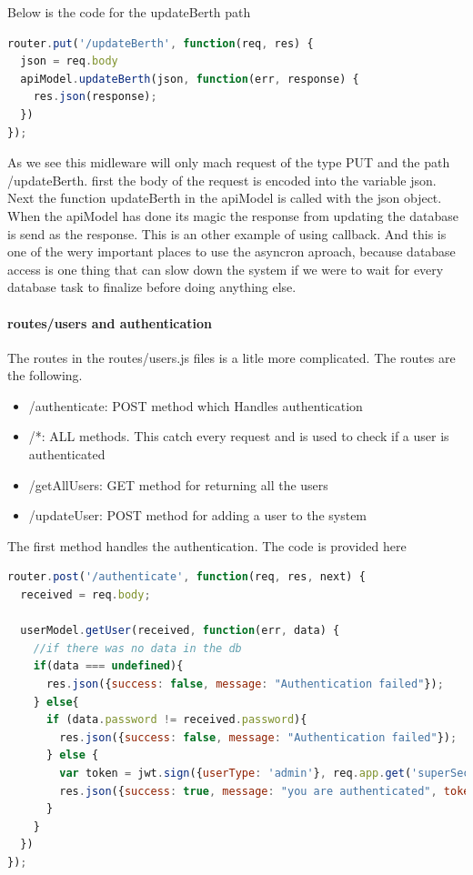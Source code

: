 \documentclass[a4paper,12pt,english]{article}
\begin{document}
Below is the code for the updateBerth path

\begin{lstlisting}[language=javascript] 
router.put('/updateBerth', function(req, res) {
  json = req.body
  apiModel.updateBerth(json, function(err, response) {
    res.json(response);
  })
});
\end{lstlisting}
As we see this midleware will only mach request of the type PUT and the path /updateBerth. first the body of the request is encoded into the variable json. Next the function updateBerth in the apiModel is called with the json object. When the apiModel has done its magic the response from updating the database is send as the response. This is an other example of using callback. And this is one of the wery important places to use the asyncron aproach, because database access is one thing that can slow down the system if we were to wait for every database task to finalize before doing anything else.

\paragraph{routes/users and authentication}
The routes in the routes/users.js files is a litle more complicated. The routes are the following.

\begin{itemize}
\item /authenticate: POST method which Handles authentication
\item /*: ALL methods. This catch every request and is used to check if a user is authenticated
\item /getAllUsers: GET method for returning all the users
\item /updateUser: POST method for adding a user to the system
\end{itemize}

The first method handles the authentication. The code is provided here

\begin{lstlisting}[language=javascript] 
router.post('/authenticate', function(req, res, next) {
  received = req.body;

  userModel.getUser(received, function(err, data) {
    //if there was no data in the db
    if(data === undefined){
      res.json({success: false, message: "Authentication failed"});
    } else{
      if (data.password != received.password){
        res.json({success: false, message: "Authentication failed"});
      } else {
        var token = jwt.sign({userType: 'admin'}, req.app.get('superSecret'));
        res.json({success: true, message: "you are authenticated", token: token})
      }
    }
  })
});
\end{lstlisting}
\end{document}
